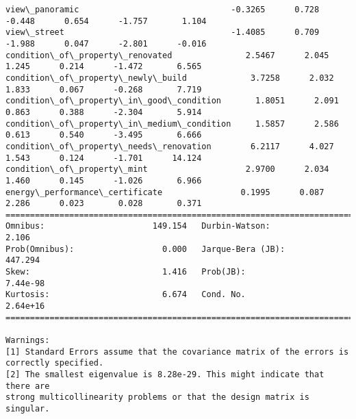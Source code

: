 \documentclass[11pt]{article}
\begin{document}
\begin{Verbatim}[commandchars=\\\{\}]
view\_panoramic                               -0.3265      0.728     -0.448      0.654      -1.757       1.104
view\_street                                  -1.4085      0.709     -1.988      0.047      -2.801      -0.016
condition\_of\_property\_renovated               2.5467      2.045      1.245      0.214      -1.472       6.565
condition\_of\_property\_newly\_build             3.7258      2.032      1.833      0.067      -0.268       7.719
condition\_of\_property\_in\_good\_condition       1.8051      2.091      0.863      0.388      -2.304       5.914
condition\_of\_property\_in\_medium\_condition     1.5857      2.586      0.613      0.540      -3.495       6.666
condition\_of\_property\_needs\_renovation        6.2117      4.027      1.543      0.124      -1.701      14.124
condition\_of\_property\_mint                    2.9700      2.034      1.460      0.145      -1.026       6.966
energy\_performance\_certificate                0.1995      0.087      2.286      0.023       0.028       0.371
==============================================================================
Omnibus:                      149.154   Durbin-Watson:                   2.106
Prob(Omnibus):                  0.000   Jarque-Bera (JB):              447.294
Skew:                           1.416   Prob(JB):                     7.44e-98
Kurtosis:                       6.674   Cond. No.                     2.64e+16
==============================================================================

Warnings:
[1] Standard Errors assume that the covariance matrix of the errors is correctly specified.
[2] The smallest eigenvalue is 8.28e-29. This might indicate that there are
strong multicollinearity problems or that the design matrix is singular.

    \end{Verbatim}
\end{document}
